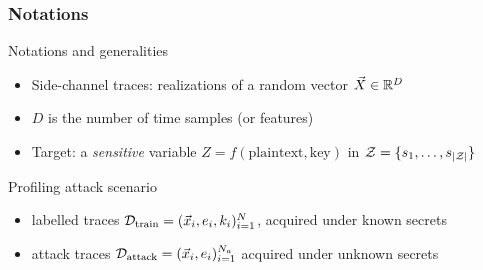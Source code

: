 \begin{frame}
\frametitle{Notations}
\begin{block}{Notations and generalities}
\begin{itemize}
\item Side-channel traces: realizations of a random vector $\vec{X} \in \mathbb{R}^D$  
\item $D$ is the number of time samples (or features)
\item Target: a \emph{sensitive} variable $Z = f(\mathrm{plaintext,key})$ in $\mathcal{Z} = \{s_{1}, \dots, s_{|\mathcal{Z}|}\}$
\end{itemize}
\end{block}
\vspace{-5pt}
\begin{block}{Profiling attack scenario}
\begin{itemize}
\item labelled traces $\mathcal{D}_{\text{train}} = (\vec{x}_i, e_i, k_i)_{i=1}^N$, acquired under known secrets
\item attack traces $\mathcal{D}_{\text{attack}} = (\vec{x}_i, e_i)_{i=1}^{N_a}$ acquired under unknown secrets
\end{itemize}
\end{block}
\end{frame}




